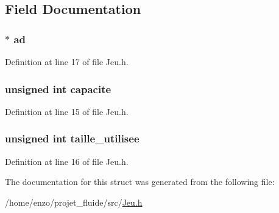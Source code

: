 \subsection{Field Documentation}
\hypertarget{structs_tableau_dynamique_a3b30ad6492b460f0995b66b2c8889426}{
\subsubsection[{ad}]{$\ast$ ad}}\label{structs_tableau_dynamique_a3b30ad6492b460f0995b66b2c8889426}


Definition at line 17 of file Jeu.\-h.

\hypertarget{structs_tableau_dynamique_ac3e3c7196292bbc416a904d29ee638c8}{
\subsubsection[{capacite}]{\setlength{\rightskip}{0pt plus 5cm}unsigned int capacite}}\label{structs_tableau_dynamique_ac3e3c7196292bbc416a904d29ee638c8}


Definition at line 15 of file Jeu.\-h.

\hypertarget{structs_tableau_dynamique_aaf681889cbd00b7c45951f63b10f969a}{
\subsubsection[{taille\-\_\-utilisee}]{\setlength{\rightskip}{0pt plus 5cm}unsigned int taille\-\_\-utilisee}}\label{structs_tableau_dynamique_aaf681889cbd00b7c45951f63b10f969a}


Definition at line 16 of file Jeu.\-h.



The documentation for this struct was generated from the following file\-:\begin{DoxyCompactItemize}
\item 
/home/enzo/projet\-\_\-fluide/src/\hyperlink{_jeu_8h}{Jeu.\-h}\end{DoxyCompactItemize}
